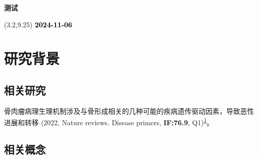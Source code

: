 \documentclass[
]{article}
\author{}
\date{\vspace{-2.5em}}
\begin{document}
\begin{titlepage} 
\begin{center} \textbf{\huge 测试} \vspace{4em}
\begin{textblock}{10}(3.2,9.25) \huge
\textbf{\textcolor{black}{2024-11-06}}
\end{textblock} \end{center} \end{titlepage}
\restoregeometry


\begin{center}\vspace{1.5cm}\end{center}\tableofcontents

\begin{center}\vspace{1.5cm}\end{center}\listoffigures

\begin{center}\vspace{1.5cm}\end{center}\listoftables

\newpage


\hypertarget{abstract}{%
\section{研究背景}\label{abstract}}

\hypertarget{ux76f8ux5173ux7814ux7a76}{%
\subsection{相关研究}\label{ux76f8ux5173ux7814ux7a76}}

骨肉瘤病理生理机制涉及与骨形成相关的几种可能的疾病遗传驱动因素，导致恶性进展和转移 (2022, Nature reviews. Disease primers, \textbf{IF:76.9}, Q1)\textsuperscript{\protect\hyperlink{ref-OsteosarcomaBeird2022}{1}}。

\hypertarget{ux76f8ux5173ux6982ux5ff5}{%
\subsection{相关概念}\label{ux76f8ux5173ux6982ux5ff5}}
\end{document}
